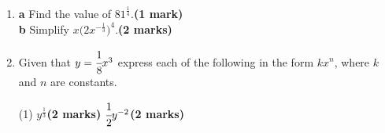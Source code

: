 \documentclass[fleqn, twoside]{article}
\begin{document}
\begin{enumerate}
    \item \hspace*{2mm}\textbf{a}\hspace*{5mm} Find the value of $81^{\textstyle\frac{1}{4}}$.\hfill\textbf{(1 mark)}\vspace{1mm}\\
          \hspace*{2mm}\textbf{b}\hspace*{5mm} Simplify $x\Big(2x^{-\textstyle\frac{1}{3}}\Big)^4$.\hfill\textbf{(2 marks)}
    \item Given that $y=\cfrac{1}{8}x^3$ express each of the following in the form $kx^n$, where $k$ and $n$ are constants.\vspace{-2mm}
        \begin{tasks}(1)
            \task $y^{\textstyle\frac{1}{3}}$\hfill\textbf{(2 marks)}\vspace{-1mm}
            \task $\cfrac{1}{2}y^{-2}$\hfill\textbf{(2 marks)}
        \end{tasks}
\end{enumerate}
\end{document}
